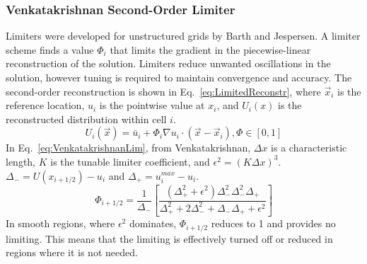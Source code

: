 \subsubsection*{Venkatakrishnan Second-Order Limiter}
Limiters were developed for unstructured grids by Barth and Jespersen\cite{barth1989}. A limiter scheme finds a value $\Phi_i$ that limits the gradient in the piecewise-linear reconstruction of the solution. Limiters reduce unwanted oscillations in the solution, however tuning is required to maintain convergence and accuracy. The second-order reconstruction is shown in Eq.~\ref{eq:LimitedReconstr}, where $\vec{x}_i$ is the reference location, $u_i$ is the pointwise value at $x_i$, and $U_i(x)$ is the reconstructed distribution within cell $i$.
\begin{equation}\label{eq:LimitedReconstr}
U_i(\vec{x}) = \bar{u}_i + \Phi_i \nabla u_i \cdot (\vec{x}-\vec{x}_i ), \Phi\in [0,1]
\end{equation}
In Eq.~\ref{eq:VenkatakrishnanLim}, from Venkatakrishnan\cite{Venkatakrishnan:1993}, $\Delta x$ is a characteristic length, $K$ is the tunable limiter coefficient, and $\epsilon^2 = (K\Delta x)^3$. $\Delta_-=U(x_{i+1/2})-u_i$ and $\Delta_+ = u_i^{max}-u_i$. 
\begin{equation}\label{eq:VenkatakrishnanLim}
\Phi_{i+1/2} = \frac{1}{\Delta_-}\left[ \frac{(\Delta_+^2+\epsilon^2)\Delta_-^2\Delta_-^2\Delta_+}{\Delta_+^2+2\Delta_-^2+\Delta_-\Delta_++\epsilon^2}\right]
\end{equation}
In smooth regions, where $\epsilon^2$ dominates,  $\Phi_{i+1/2}$ reduces to 1 and provides no limiting. This means that the limiting is effectively turned off or reduced in regions where it is not needed. 


